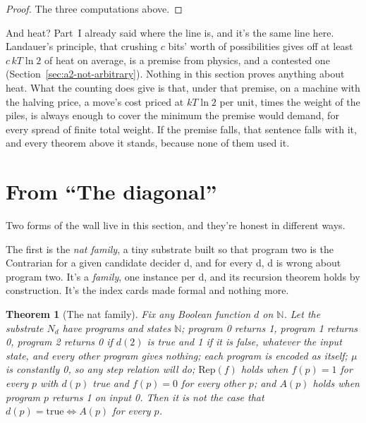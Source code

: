 \documentclass[11pt,twoside]{article}
\theoremstyle{thielethm}
\newtheorem{theorem}{Theorem}[section]
\theoremstyle{thieledef}
\theoremstyle{thieledef}
\theoremstyle{thieledef}
\theoremstyle{thielethm}
\theoremstyle{thieleobs}
\theoremstyle{thielethm}
\begin{document}
\begin{proof}
The three computations above.
\end{proof}

And heat? Part~I already said where the line is, and it's the same line here. Landauer's
principle, that crushing $c$ bits' worth of possibilities gives off at least $c\,kT\ln 2$ of heat on
average, is a premise from physics, and a contested one (Section~\ref{sec:a2-not-arbitrary}). Nothing in
this section proves anything about heat. What the counting does give is that, under that premise,
on a machine with the halving price, a move's cost priced at $kT \ln 2$ per unit,
times the weight of the piles, is always enough
to cover the minimum the premise would
demand, for every spread of finite total weight.  If the premise falls, that sentence falls
with it, and every theorem above it stands, because none of them used it.


\section{From ``The diagonal''}


Two forms of the wall live in this section, and they're honest in different ways.

The first is the \emph{nat family}, a tiny substrate built so that program two is the
Contrarian for a given candidate decider d, and for every d, d is wrong about program two. It's
a \emph{family}, one instance per d, and its recursion theorem holds by construction. It's the
index cards made formal and nothing more.

\begin{theorem}[The nat family]\label{thm:u12-nat-family}
Fix any Boolean function $d$ on $\mathbb{N}$. Let the substrate $N_d$ have programs and
states $\mathbb{N}$; program 0 returns 1, program 1 returns 0, program 2 returns 0 if $d(2)$
is true and 1 if it is false, whatever the input state, and every other program gives nothing;
each program is encoded as itself; $\mu$ is constantly 0, so any step relation will do;
$\mathrm{Rep}(f)$ holds when $f(p) = 1$ for every $p$ with $d(p)$ true and $f(p) = 0$ for
every other $p$; and $A(p)$ holds when program $p$ returns 1 on input 0. Then it is not the
case that $d(p) = \mathrm{true} \iff A(p)$ for every $p$.
\end{theorem}
\end{document}
